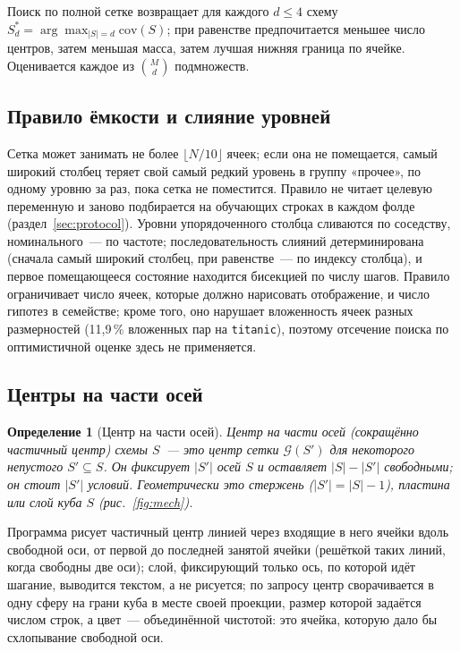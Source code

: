 \documentclass[11pt]{article}
\newtheorem{definition}{Определение}
\newcommand{\cov}{\mathrm{cov}}
\begin{document}
Поиск по полной сетке возвращает для каждого $d\le 4$ схему $S^*_d=\arg\max_{|S|=d}\cov(S)$; при равенстве предпочитается меньшее число центров, затем меньшая масса, затем лучшая нижняя граница по ячейке. Оценивается каждое из $\binom{M}{d}$ подмножеств.

\subsection{Правило ёмкости и слияние уровней}\label{sec:capacity}
Сетка может занимать не более $\lfloor N/10\rfloor$ ячеек; если она не помещается, самый широкий столбец теряет свой самый редкий уровень в группу «прочее», по одному уровню за раз, пока сетка не поместится. Правило не читает целевую переменную и заново подбирается на обучающих строках в каждом фолде (раздел~\ref{sec:protocol}). Уровни упорядоченного столбца сливаются по соседству, номинального~--- по частоте; последовательность слияний детерминирована (сначала самый широкий столбец, при равенстве~--- по индексу столбца), и первое помещающееся состояние находится бисекцией по числу шагов. Правило ограничивает число ячеек, которые должно нарисовать отображение, и число гипотез в семействе; кроме того, оно нарушает вложенность ячеек разных размерностей (11,9\,\% вложенных пар на \texttt{titanic}), поэтому отсечение поиска по оптимистичной оценке здесь не применяется.

\subsection{Центры на части осей}\label{sec:partial}
\begin{definition}[Центр на части осей]
Центр на части осей (сокращённо \emph{частичный центр}) схемы $S$~--- это центр сетки $\mathcal{G}(S')$ для некоторого непустого $S'\subseteq S$. Он фиксирует $|S'|$ осей $S$ и оставляет $|S|-|S'|$ свободными; он стоит $|S'|$ условий. Геометрически это стержень ($|S'|=|S|-1$), пластина или слой куба $S$ (рис.~\ref{fig:mech}).
\end{definition}

Программа рисует частичный центр линией через входящие в него ячейки вдоль свободной оси, от первой до последней занятой ячейки (решёткой таких линий, когда свободны две оси); слой, фиксирующий только ось, по которой идёт шагание, выводится текстом, а не рисуется; по запросу центр сворачивается в одну сферу на грани куба в месте своей проекции, размер которой задаётся числом строк, а цвет~--- объединённой чистотой: это ячейка, которую дало бы схлопывание свободной оси.
\end{document}
